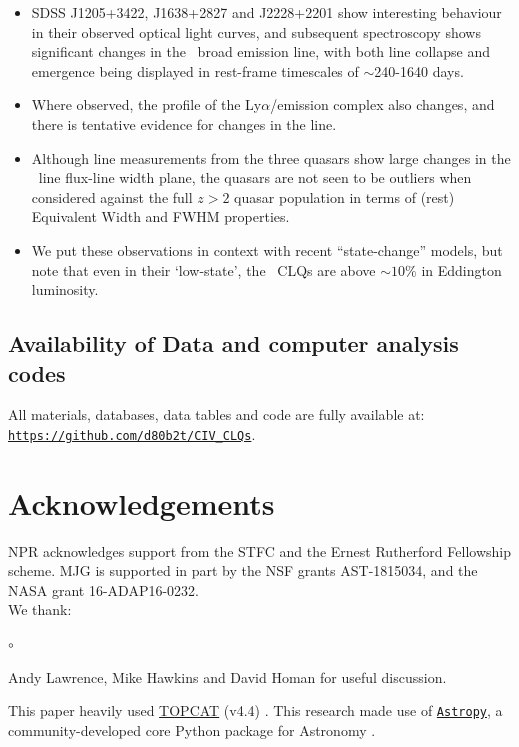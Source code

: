 \documentclass[fleqn,usenatbib]{mnras}
\begin{document}
\begin{itemize}
\item SDSS J1205+3422, J1638+2827 and J2228+2201 show interesting behaviour
  in their observed optical light curves, and subsequent spectroscopy
  shows significant changes in the \civ\ broad emission line, with both
  line collapse and emergence being displayed in rest-frame timescales
  of $\sim$240-1640 days.
\item Where observed, the profile of the Ly$\alpha$/\nv emission complex
  also changes, and there is tentative evidence for changes in the \mgii
  line.
\item Although line measurements from the three quasars show large changes
  in the \civ\ line flux-line width plane, the quasars are not seen to
  be outliers when considered against the full $z>2$ quasar population
  in terms of (rest) Equivalent Width and FWHM properties.
\item 
  We put these observations in context with recent ``state-change''
  models, but note that even in their `low-state', the \civ\ CLQs are
  above $\sim10\%$ in Eddington luminosity.
\end{itemize}




\subsection*{Availability of Data and computer analysis codes} 
All materials, databases, data tables and code are fully available at: 
\href{https://github.com/d80b2t/CIV_CLQs}{\tt https://github.com/d80b2t/CIV\_CLQs}.


\section*{Acknowledgements}
NPR acknowledges support from the STFC and the Ernest Rutherford Fellowship scheme. 
MJG is supported in part by the NSF grants AST-1815034, and the NASA grant 16-ADAP16-0232. 
\\

\noindent
We thank:
\begin{list}{$\circ$}{}
  \item Andy Lawrence, Mike Hawkins and David Homan for useful discussion.
\end{list}

This paper heavily used \href{http://www.star.bris.ac.uk/~mbt/topcat/}{TOPCAT} (v4.4)
\citep[][]{Taylor2005, Taylor2011}.
This research made use of \href{http://www.astropy.org}{\tt Astropy}, 
a community-developed core Python package for Astronomy 
\citep{AstropyCollaboration2013, AstropyCollaboration2018}.
\end{document}
